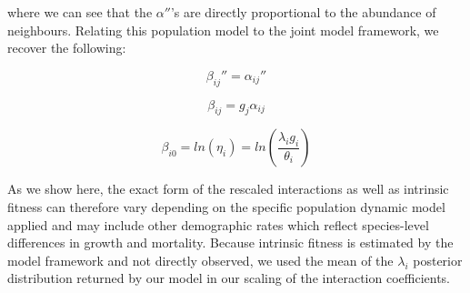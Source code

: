\documentclass[a4,12pt]{article}
\begin{document}
        where we can see that the ${\alpha}''$'s are directly proportional to the abundance of neighbours. Relating this population model to the joint model framework, we recover the following: 

        \begin{equation}
        {\beta_{ij}}'' = {\alpha_{ij}}''
        \end{equation}

        \begin{equation}
        \beta_{ij} = g_{j} \alpha_{ij}
        \end{equation}

        \begin{equation}
        \beta_{i0}  = ln(\eta_{i}) = ln(\frac{\lambda_{i} g_{i}}{\theta_{i}})
        \end{equation}



        As we show here, the exact form of the rescaled interactions as well as intrinsic fitness can therefore vary depending on the specific population dynamic model applied and may include other demographic rates which reflect species-level differences in growth and mortality. Because intrinsic fitness is estimated by the model framework and not directly observed, we used the mean of the $\lambda_{i}$ posterior distribution returned by our model in our scaling of the interaction coefficients.



\end{document}
